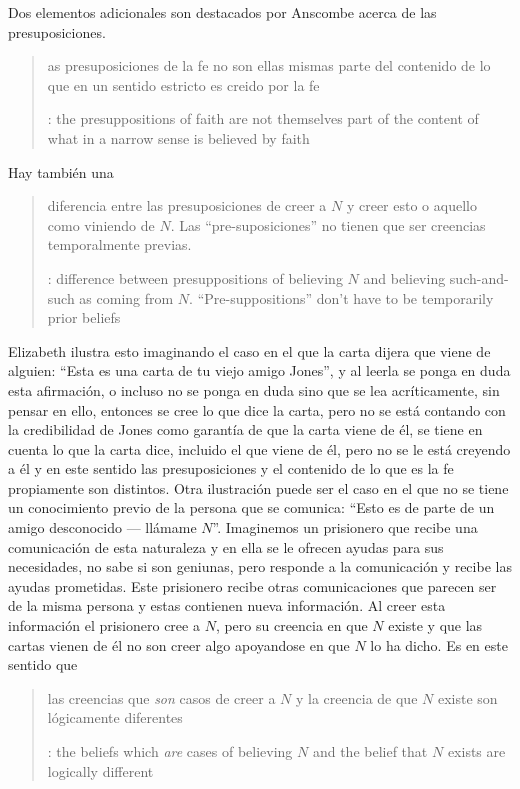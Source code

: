 Dos elementos adicionales son destacados por Anscombe acerca de las presuposiciones. \blockquote[{\cite[117]{anscombe1981erp:faith}}: the presuppositions of faith are not themselves part of the content of what in a narrow sense is believed by faith]{as presuposiciones de la fe no son ellas mismas parte del contenido de lo que en un sentido estricto es creido por la fe}. Hay también una \blockquote[{\cite[118]{anscombe1981erp:faith}}: difference between presuppositions of believing $N$ and believing such-and-such as coming from $N$. ``Pre-suppositions'' don't have to be temporarily prior beliefs]{diferencia entre las presuposiciones de creer a $N$ y creer esto o aquello como viniendo de $N$. Las ``pre-suposiciones'' no tienen que ser creencias temporalmente previas.}. Elizabeth ilustra esto imaginando el caso en el que la carta dijera que viene de alguien: \enquote{Esta es una carta de tu viejo amigo Jones}, y al leerla se ponga en duda esta afirmación, o incluso no se ponga en duda sino que se lea acríticamente, sin pensar en ello, entonces se cree lo que dice la carta, pero no se está contando con la credibilidad de Jones como garantía de que la carta viene de él, se tiene en cuenta lo que la carta dice, incluido el que viene de él, pero no se le está creyendo a él y en este sentido las presuposiciones y el contenido de lo que es la fe propiamente son distintos. Otra ilustración puede ser el caso en el que no se tiene un conocimiento previo de la persona que se comunica: \enquote{Esto es de parte de un amigo desconocido --- llámame $N$}. Imaginemos un prisionero que recibe una comunicación de esta naturaleza y en ella se le ofrecen ayudas para sus necesidades, no sabe si son geniunas, pero responde a la comunicación y recibe las ayudas prometidas. Este prisionero recibe otras comunicaciones que parecen ser de la misma persona y estas contienen nueva información. Al creer esta información el prisionero cree a $N$, pero su creencia en que $N$ existe y que las cartas vienen de él no son creer algo apoyandose en que $N$ lo ha dicho. Es en este sentido que \blockquote[{\cite[118]{anscombe1981erp:faith}}: the beliefs which \emph{are} cases of believing $N$ and the belief that $N$ exists are logically different]{las creencias que \emph{son} casos de creer a $N$ y la creencia de que $N$ existe son lógicamente diferentes}.


